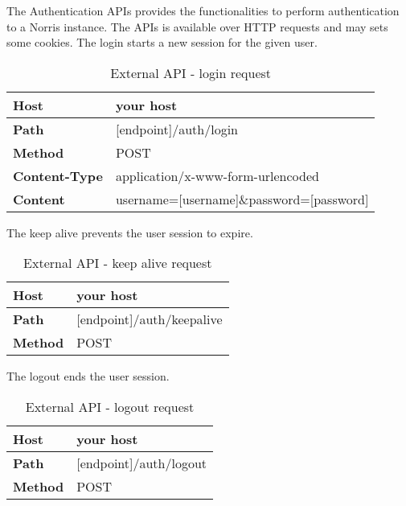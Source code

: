         The Authentication APIs provides the functionalities to perform authentication to a Norris instance. The APIs is available over HTTP requests and may sets some cookies.
            The login starts a new session for the given user. \\
            \begin{table}[H]
                \centering
                \begin{tabu}{|l|l|}
                    \hline
                    \textbf{Host} & your host \\ \hline
                    \textbf{Path} & [endpoint]/auth/login \\ \hline
                    \textbf{Method} & POST \\ \hline
                    \textbf{Content-Type} & application/x-www-form-urlencoded \\ \hline
                    \textbf{Content} & username=[username]\&password=[password] \\ \hline
                \end{tabu}
                \caption{External API - login request}
            \end{table}
            The keep alive prevents the user session to expire. \\
            \begin{table}[H]
                \centering
                \begin{tabu}{|l|l|}
                    \hline
                    \textbf{Host} & your host \\ \hline
                    \textbf{Path} & [endpoint]/auth/keepalive \\ \hline
                    \textbf{Method} & POST \\ \hline
                \end{tabu}
                \caption{External API - keep alive request}
            \end{table}
            The logout ends the user session. \\
            \begin{table}[H]
                \centering
                \begin{tabu}{|l|l|}
                    \hline
                    \textbf{Host} & your host \\ \hline
                    \textbf{Path} & [endpoint]/auth/logout \\ \hline
                    \textbf{Method} & POST \\ \hline
                \end{tabu}
                \caption{External API - logout request}
            \end{table}